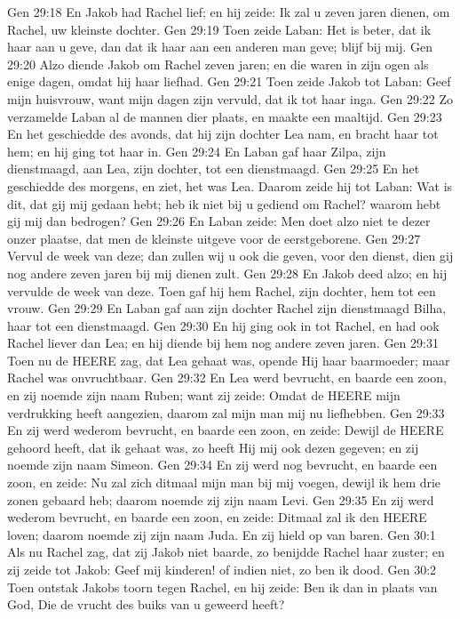Gen 29:18  En Jakob had Rachel lief; en hij zeide: Ik zal u zeven jaren dienen, om Rachel, uw kleinste dochter.
Gen 29:19  Toen zeide Laban: Het is beter, dat ik haar aan u geve, dan dat ik haar aan een anderen man geve; blijf bij mij.
Gen 29:20  Alzo diende Jakob om Rachel zeven jaren; en die waren in zijn ogen als enige dagen, omdat hij haar liefhad.
Gen 29:21  Toen zeide Jakob tot Laban: Geef mijn huisvrouw, want mijn dagen zijn vervuld, dat ik tot haar inga.
Gen 29:22  Zo verzamelde Laban al de mannen dier plaats, en maakte een maaltijd.
Gen 29:23  En het geschiedde des avonds, dat hij zijn dochter Lea nam, en bracht haar tot hem; en hij ging tot haar in.
Gen 29:24  En Laban gaf haar Zilpa, zijn dienstmaagd, aan Lea, zijn dochter, tot een dienstmaagd.
Gen 29:25  En het geschiedde des morgens, en ziet, het was Lea. Daarom zeide hij tot Laban: Wat is dit, dat gij mij gedaan hebt; heb ik niet bij u gediend om Rachel? waarom hebt gij mij dan bedrogen?
Gen 29:26  En Laban zeide: Men doet alzo niet te dezer onzer plaatse, dat men de kleinste uitgeve voor de eerstgeborene.
Gen 29:27  Vervul de week van deze; dan zullen wij u ook die geven, voor den dienst, dien gij nog andere zeven jaren bij mij dienen zult.
Gen 29:28  En Jakob deed alzo; en hij vervulde de week van deze. Toen gaf hij hem Rachel, zijn dochter, hem tot een vrouw.
Gen 29:29  En Laban gaf aan zijn dochter Rachel zijn dienstmaagd Bilha, haar tot een dienstmaagd.
Gen 29:30  En hij ging ook in tot Rachel, en had ook Rachel liever dan Lea; en hij diende bij hem nog andere zeven jaren.
Gen 29:31  Toen nu de HEERE zag, dat Lea gehaat was, opende Hij haar baarmoeder; maar Rachel was onvruchtbaar.
Gen 29:32  En Lea werd bevrucht, en baarde een zoon, en zij noemde zijn naam Ruben; want zij zeide: Omdat de HEERE mijn verdrukking heeft aangezien, daarom zal mijn man mij nu liefhebben.
Gen 29:33  En zij werd wederom bevrucht, en baarde een zoon, en zeide: Dewijl de HEERE gehoord heeft, dat ik gehaat was, zo heeft Hij mij ook dezen gegeven; en zij noemde zijn naam Simeon.
Gen 29:34  En zij werd nog bevrucht, en baarde een zoon, en zeide: Nu zal zich ditmaal mijn man bij mij voegen, dewijl ik hem drie zonen gebaard heb; daarom noemde zij zijn naam Levi.
Gen 29:35  En zij werd wederom bevrucht, en baarde een zoon, en zeide: Ditmaal zal ik den HEERE loven; daarom noemde zij zijn naam Juda. En zij hield op van baren.
Gen 30:1  Als nu Rachel zag, dat zij Jakob niet baarde, zo benijdde Rachel haar zuster; en zij zeide tot Jakob: Geef mij kinderen! of indien niet, zo ben ik dood.
Gen 30:2  Toen ontstak Jakobs toorn tegen Rachel, en hij zeide: Ben ik dan in plaats van God, Die de vrucht des buiks van u geweerd heeft?
